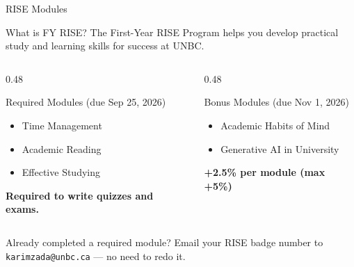 \documentclass[aspectratio=169]{beamer}
\begin{document}
\begin{frame}{RISE Modules}
\transfade
\begin{block}{What is FY RISE?}
  The First-Year RISE Program helps you develop practical study and learning skills for success at UNBC.
\end{block}
\vspace{0.3em}
\begin{columns}
  \begin{column}{0.48\textwidth}
    \begin{block}{Required Modules \textnormal{(due Sep 25, 2026)}}
      \begin{itemize}
        \item Time Management
        \item Academic Reading
        \item Effective Studying
      \end{itemize}
      \textbf{Required to write quizzes and exams.}
    \end{block}
  \end{column}
  \begin{column}{0.48\textwidth}
    \begin{block}{Bonus Modules \textnormal{(due Nov 1, 2026)}}
      \begin{itemize}
        \item Academic Habits of Mind
        \item Generative AI in University
      \end{itemize}
      \textbf{+2.5\% per module (max +5\%)}
    \end{block}
  \end{column}
\end{columns}
\vspace{0.3em}
\begin{alertblock}{Already completed a required module?}
  Email your RISE badge number to \texttt{karimzada@unbc.ca} --- no need to redo it.
\end{alertblock}
\end{frame}
\end{document}
